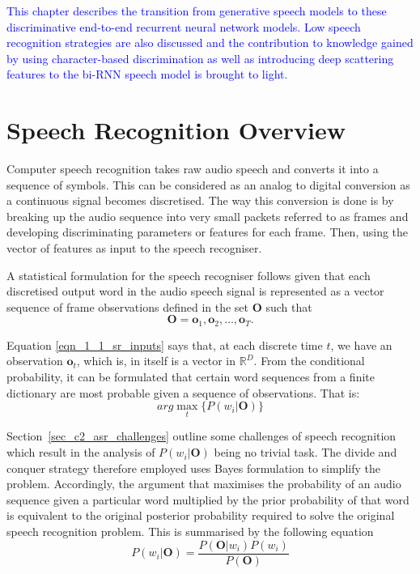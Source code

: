 \textcolor{blue}{This chapter describes the transition from generative speech models to these discriminative end-to-end recurrent neural network models.  Low speech recognition strategies are also discussed and the contribution to knowledge gained by using character-based discrimination as well as introducing deep scattering features to the bi-RNN speech model is brought to light.}

\section{Speech Recognition Overview}\label{Ch_2_SROverview}
Computer speech recognition takes raw audio speech and converts it into a sequence of symbols.  This can be considered as an analog to digital conversion as a continuous signal becomes discretised.  The way this conversion is done is by breaking up the audio sequence into very small packets referred to as frames and developing discriminating parameters or features for each frame. Then, using the vector of features as input to the speech recogniser.  

A statistical formulation \citep{young2002htk} for the speech recogniser follows given that each discretised output word in the audio speech signal is represented as a vector sequence of frame observations defined in the set $\mathbf{O}$ such that 
\begin{equation}\mathbf{O}=\mathbf{o}_1,\mathbf{o}_2,\dots,\mathbf{o}_T.
\label{eqn_1_1_sr_inputs}
\end{equation}

Equation \ref{eqn_1_1_sr_inputs} says that, at each discrete time $t$, we have an observation $\mathbf{o}_t$, which is, in itself is a vector in $\mathbb{R}^D$.  From the conditional probability, it can be formulated that certain word sequences from a finite dictionary are most probable given a sequence of observations. That is:
\begin{equation}arg\max_t\{P(w_i|\mathbf{O})\}
\label{eqn_2_2_srgen}
\end{equation}

Section~\ref{sec_c2_asr_challenges} outline some challenges of  speech recognition which result in the  analysis of $P(w_i|\mathbf{O})$ being no trivial task.  The divide and conquer strategy therefore employed uses Bayes formulation to simplify the problem.  Accordingly, the argument that maximises the probability of an audio sequence given a particular word multiplied by the prior probability of that word is equivalent to the original posterior probability required to solve the original speech recognition problem. This is summarised by the following equation
\begin{equation}P(w_i|\mathbf{O})=\frac{P(\mathbf{O}|w_i)P(w_i)}{P(\mathbf{O})}
\label{eqn_2_3_bayes_sr}
\end{equation}

